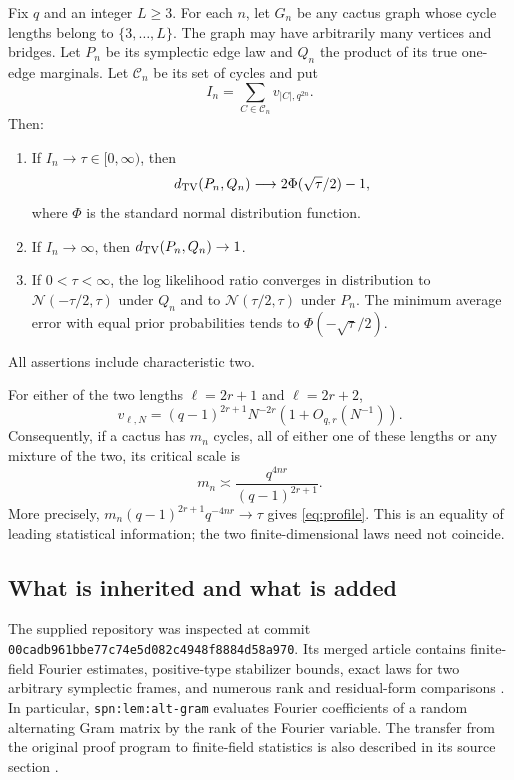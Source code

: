 \begin{theorem}\label{thm:main}
Fix $q$ and an integer $L\ge3$. For each $n$, let $G_n$ be any cactus graph whose
cycle lengths belong to $\{3,\ldots,L\}$. The graph may have arbitrarily many
vertices and bridges. Let $P_n$ be its symplectic edge law and $Q_n$ the product
of its true one-edge marginals. Let $\mathcal C_n$ be its set of cycles and put
\[
I_n=\sum_{C\in\mathcal C_n}v_{|C|,q^{2n}}.
\]
Then:
\begin{enumerate}[label=(\roman*)]
\item If $I_n\to\tau\in[0,\infty)$, then
\begin{equation}\label{eq:profile}
d_{\mathrm{TV}}(P_n,Q_n)\longrightarrow 2\Phi(\sqrt{\tau}/2)-1,
\end{equation}
where $\Phi$ is the standard normal distribution function.
\item If $I_n\to\infty$, then $d_{\mathrm{TV}}(P_n,Q_n)\to1$.
\item If $0<\tau<\infty$, the log likelihood ratio converges in distribution to
$\mathcal N(-\tau/2,\tau)$ under $Q_n$ and to
$\mathcal N(\tau/2,\tau)$ under $P_n$. The minimum average error with equal prior
probabilities tends to $\Phi(-\sqrt{\tau}/2)$.
\end{enumerate}
All assertions include characteristic two.
\end{theorem}

For either of the two lengths $\ell=2r+1$ and $\ell=2r+2$,
\begin{equation}\label{eq:pair}
v_{\ell,N}=(q-1)^{2r+1}N^{-2r}(1+O_{q,r}(N^{-1})).
\end{equation}
Consequently, if a cactus has $m_n$ cycles, all of either one of these lengths
or any mixture of the two, its critical scale is
\begin{equation}\label{eq:critical}
m_n\asymp\frac{q^{4nr}}{(q-1)^{2r+1}}.
\end{equation}
More precisely, $m_n(q-1)^{2r+1}q^{-4nr}\to\tau$ gives
\eqref{eq:profile}. This is an equality of leading statistical information;
the two finite-dimensional laws need not coincide.

\subsection{What is inherited and what is added}
The supplied repository was inspected at commit
\texttt{00cadb961bbe77c74e5d082c4948f8884d58a970}.
Its merged article contains finite-field Fourier estimates, positive-type
stabilizer bounds, exact laws for two arbitrary symplectic frames, and numerous
rank and residual-form comparisons \cite{ProveItSpn}. In particular,
\texttt{spn:lem:alt-gram} evaluates Fourier coefficients of a random alternating
Gram matrix by the rank of the Fourier variable. The transfer from the original
proof program to finite-field statistics is also described in its source
section \cite{ProveItSrc}.

